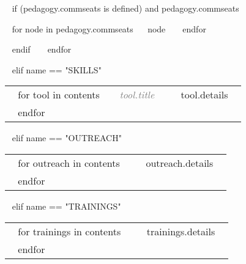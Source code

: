 \begin{minipage}{\textwidth}
  ~{ if (pedagogy.commseats is defined) and pedagogy.commseats }~
  \begin{entrylist}[.1]
    ~{ for node in pedagogy.commseats}~
     \pedentry
      {~{{ node }}~}
    ~{ endfor }~
  \end{entrylist}
  ~{ endif }~
~{ endfor }~



~{ elif name == "SKILLS" }~

\begin{tabular}{ @{} p{32mm} p{135mm} @{} }
  ~{ for tool in contents }~
  \small \textcolor{gray}{{\emph{~{{ tool.title }}~}}} & {\small ~{{ tool.details }}~} \\
  ~{ endfor }~
\end{tabular}


~{ elif name == "OUTREACH" }~

\begin{tabular}{ @{} p{32mm} p{135mm} @{} }
  ~{ for outreach in contents }~
  \small \textcolor{gray}{{\emph{ }}} & {\small ~{{ outreach.details }}~} \\
  ~{ endfor }~
\end{tabular}


~{ elif name == "TRAININGS" }~

\begin{tabular}{ @{} p{32mm} p{135mm} @{} }
  ~{ for trainings in contents }~
  \small \textcolor{gray}{{\emph{ }}} & {\small ~{{ trainings.details }}~} \\
  ~{ endfor }~
\end{tabular}



\end{minipage}
